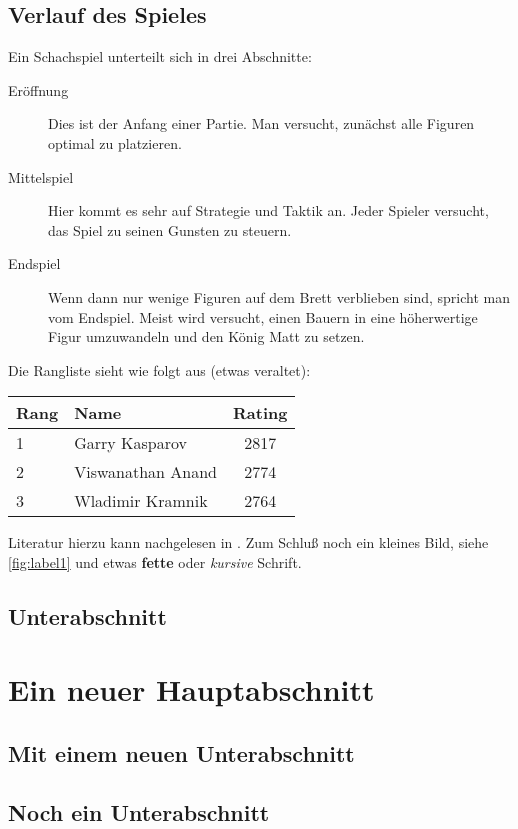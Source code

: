 \begin{refsection}
\subsection{Verlauf des Spieles}
%
Ein Schachspiel unterteilt sich in drei Abschnitte:
%
\begin{description}
  \item[Eröffnung] 
  Dies ist der Anfang einer Partie. 
  Man versucht, zunächst alle Figuren optimal zu platzieren.
  
  \item[Mittelspiel] 
  Hier kommt es sehr auf Strategie und Taktik an. 
  Jeder Spieler versucht, das Spiel zu seinen Gunsten zu steuern.
  
  \item[Endspiel] 
  Wenn dann nur wenige Figuren auf dem Brett verblieben sind, spricht man vom Endspiel. 
  Meist wird versucht, einen Bauern in eine höherwertige Figur umzuwandeln und den König Matt zu setzen.
\end{description}
Die Rangliste sieht wie folgt aus (etwas veraltet):
\begin{center}
  \begin{tabular}{llc}
    Rang & Name              & Rating \\\hline
    1    & Garry Kasparov    & 2817   \\
    2    & Viswanathan Anand & 2774   \\
    3    & Wladimir Kramnik  & 2764
  \end{tabular}
\end{center}
Literatur hierzu kann nachgelesen in \textcite{brunel:1999}. 
Zum Schluß noch ein kleines Bild, siehe \vref{fig:label1} und etwas \textbf{fette} oder \emph{kursive} Schrift.

\subsection{Unterabschnitt}
\blindtext[2]

\section*{Ein neuer Hauptabschnitt}
\subsection{Mit einem neuen Unterabschnitt}
\lipsum[1-3]

\subsection{Noch ein Unterabschnitt}
\lipsum[4-6]


\end{refsection}
